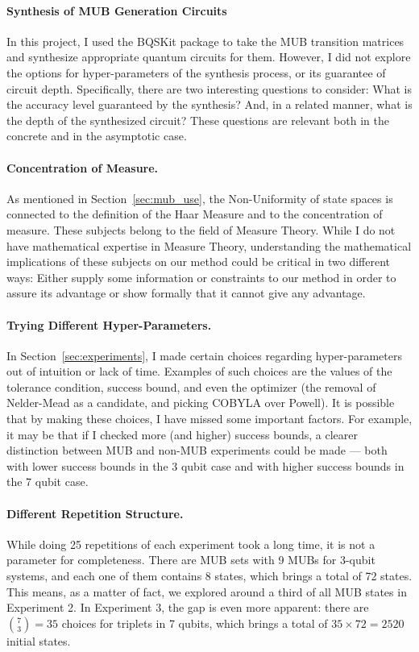 \documentclass[a4paper,12pt]{article}
\begin{document}
\paragraph*{Synthesis of MUB Generation Circuits}
In this project, I used the BQSKit package to take the MUB transition matrices and synthesize appropriate quantum circuits for them. However, I did not explore the options for hyper-parameters of the synthesis process, or its guarantee of circuit depth.
Specifically, there are two interesting questions to consider: What is the accuracy level guaranteed by the synthesis? And, in a related manner, what is the depth of the synthesized circuit? These questions are relevant both in the concrete and in the asymptotic case.

\paragraph*{Concentration of Measure.}
As mentioned in Section~\ref{sec:mub_use}, the Non-Uniformity of state spaces is connected to the definition of the Haar Measure and to the concentration of measure.
These subjects belong to the field of Measure Theory.
While I do not have mathematical expertise in Measure Theory, understanding the mathematical implications of these subjects on our method could be critical in two different ways: Either supply some information or constraints to our method in order to assure its advantage or show formally that it cannot give any advantage.

\paragraph*{Trying Different Hyper-Parameters.}
In Section~\ref{sec:experiments}, I made certain choices regarding hyper-parameters out of intuition or lack of time.
Examples of such choices are the values of the tolerance condition, success bound, and even the optimizer (the removal of Nelder-Mead as a candidate, and picking COBYLA over Powell).
It is possible that by making these choices, I have missed some important factors.
For example, it may be that if I checked more (and higher) success bounds, a clearer distinction between MUB and non-MUB experiments could be made --- both with lower success bounds in the 3 qubit case and with higher success bounds in the 7 qubit case.

\paragraph*{Different Repetition Structure.}
While doing 25 repetitions of each experiment took a long time, it is not a parameter for completeness.
There are MUB sets with 9 MUBs for 3-qubit systems, and each one of them contains 8 states, which brings a total of 72 states.
This means, as a matter of fact, we explored around a third of all MUB states in Experiment 2.
In Experiment 3, the gap is even more apparent: there are ${7 \choose 3} = 35$ choices for triplets in 7 qubits, which brings a total of $35 \times 72 = 2520$ initial states.
\end{document}
